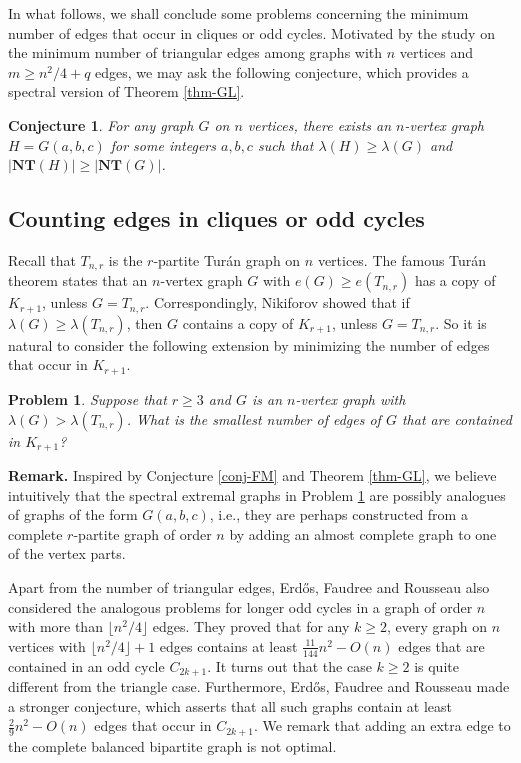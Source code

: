\documentclass[11pt]{article}
\newtheorem{conjecture}[theorem]{Conjecture}
\newtheorem{problem}[theorem]{Problem}
\begin{document}
\medskip 
In what follows, 
we shall conclude some problems 
concerning the minimum number of edges that occur in cliques or odd cycles. 
Motivated by the study on the minimum number of 
 triangular edges
 among graphs with $n$ vertices and $m\ge n^2/4 +q $ edges, 
 we may ask the following conjecture, 
 which provides a spectral version of 
 Theorem \ref{thm-GL}. 
 
 \begin{conjecture}  
For any graph $G$ on  $n$ vertices, there exists 
an $n$-vertex graph $H=G(a,b,c)$  for some integers $a,b,c$ such that $\lambda (H)\ge \lambda(G)$  and $|\mathbf{NT}(H)| \ge |\mathbf{NT}(G)|$. 
\end{conjecture} 


 
 \subsection{Counting edges in cliques or odd cycles}
 
Recall that $T_{n,r}$ is the $r$-partite Tur\'{a}n graph on $n$ vertices. 
The famous Tur\'{a}n theorem  \cite[p. 294]{Bollobas78} 
states that an $n$-vertex  graph $G$ with 
   $ e(G)\ge e(T_{n,r})$ has a copy of $K_{r+1}$, unless  $G=T_{n,r}$. Correspondingly, 
   Nikiforov \cite{Niki2007laa2} showed that if 
   $\lambda (G) \ge \lambda (T_{n,r})$, then 
   $G$ contains a copy of $K_{r+1}$, unless $G=T_{n,r}$. 
   So it is natural to consider the following extension 
   by minimizing the number of edges that occur in $K_{r+1}$. 

\begin{problem} \label{prob-clique}
Suppose that $r\ge 3$ and 
$G$ is an $n$-vertex graph with 
$\lambda (G) > \lambda (T_{n,r})$. 
What is the smallest number of edges  of $G$ that 
are contained in  $K_{r+1}$?  
\end{problem}

\noindent 
{\bf Remark.} 
Inspired by Conjecture \ref{conj-FM} and Theorem 
\ref{thm-GL}, 
we believe intuitively that the spectral extremal graphs 
in Problem \ref{prob-clique} 
  are possibly analogues of graphs of the form $G(a,b,c)$, i.e., 
 they are perhaps constructed from 
 a complete $r$-partite graph of order $n$ by 
adding an almost complete graph to one of the vertex parts. 



Apart from the number of triangular edges, 
Erd\H{o}s,  Faudree and Rousseau \cite{EFR1992} 
also considered the analogous problems 
for longer odd cycles in a graph of order $n$ with 
more than $\lfloor n^2/4 \rfloor$ edges. 
They proved that for any $k\ge 2$, every 
graph on $n$ vertices with $\lfloor n^2/4\rfloor +1$ 
edges contains at least $\frac{11}{144}n^2 - O(n)$ 
edges that are contained in an odd cycle $C_{2k+1}$.  
It turns out that the case $k\ge 2$ is quite different from 
the triangle case.  
Furthermore, 
Erd\H{o}s,  Faudree and Rousseau \cite{EFR1992} made 
a stronger conjecture, 
which asserts that all such graphs 
contain at least $\frac{2}{9}n^2 - O(n)$ edges that occur in $C_{2k+1}$. 
We remark that adding an extra edge 
to the complete balanced bipartite graph is not optimal.  
\end{document}
